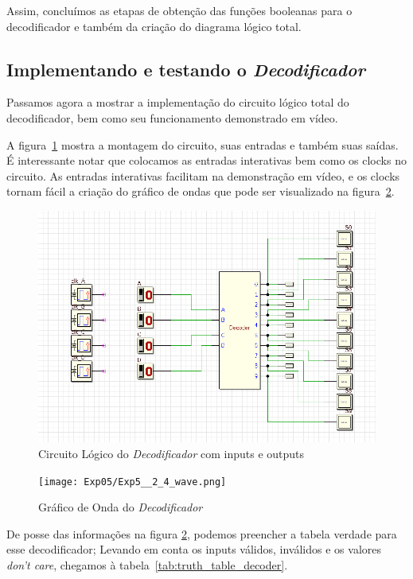 \documentclass[12pt]{article}
\begin{document}
Assim, concluímos as etapas de obtenção das funções booleanas para o
decodificador e também da criação do diagrama lógico total.

\subsection{Implementando e testando o \emph{Decodificador}}\label{sec:2.4}

Passamos agora a mostrar a implementação do circuito lógico total do
decodificador, bem como seu funcionamento demonstrado em vídeo.

A figura~\ref{fig:Exp5__2_4_circuit.png} mostra a montagem do circuito, suas
entradas e também suas saídas. É interessante notar que colocamos as entradas
interativas bem como os clocks no circuito. As entradas interativas facilitam na
demonstração em vídeo, e os clocks tornam fácil a criação do gráfico de ondas
que pode ser visualizado na figura~\ref{fig:Exp5__2_4_wave.png}.

\begin{figure}[htp]
    \centering
    \includegraphics[width=12cm]{Exp05/Exp5__2_4_circuit.png}
    \caption{Circuito Lógico do \emph{Decodificador} com inputs e outputs}
    \label{fig:Exp5__2_4_circuit.png}
\end{figure}

\begin{figure}[htp]
    \centering
    \texttt{[image: Exp05/Exp5\_\_2\_4\_wave.png]}
    \caption{Gráfico de Onda do \emph{Decodificador}}
    \label{fig:Exp5__2_4_wave.png}
\end{figure}

De posse das informações na figura \ref{fig:Exp5__2_4_wave.png}, podemos
preencher a tabela verdade para esse decodificador; Levando em conta os inputs
válidos, inválidos e os valores \emph{don't care}, chegamos à
tabela~\ref{tab:truth_table_decoder}.
\end{document}
